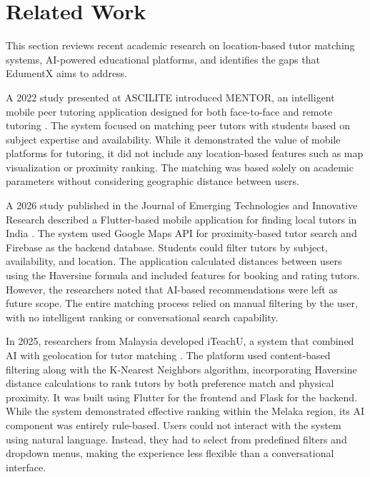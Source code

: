 \documentclass[12pt]{report}
\begin{document}
\section{Related Work}

This section reviews recent academic research on location-based
tutor matching systems, AI-powered educational platforms, and
identifies the gaps that EdumentX aims to address.

A 2022 study presented at ASCILITE introduced MENTOR, an
intelligent mobile peer tutoring application designed for both
face-to-face and remote tutoring \citep{Chung2022MENTOR}. The
system focused on matching peer tutors with students based on
subject expertise and availability. While it demonstrated the
value of mobile platforms for tutoring, it did not include any
location-based features such as map visualization or proximity
ranking. The matching was based solely on academic parameters
without considering geographic distance between users.

A 2026 study published in the Journal of Emerging Technologies
and Innovative Research described a Flutter-based mobile
application for finding local tutors in India
\citep{Sharma2026LocalTutor}. The system used Google Maps API
for proximity-based tutor search and Firebase as the backend
database. Students could filter tutors by subject, availability,
and location. The application calculated distances between
users using the Haversine formula and included features for
booking and rating tutors. However, the researchers noted that
AI-based recommendations were left as future scope. The entire
matching process relied on manual filtering by the user, with
no intelligent ranking or conversational search capability.

In 2025, researchers from Malaysia developed iTeachU, a system
that combined AI with geolocation for tutor matching
\citep{Shari2025iTeachU}. The platform used content-based
filtering along with the K-Nearest Neighbors algorithm,
incorporating Haversine distance calculations to rank tutors
by both preference match and physical proximity. It was built
using Flutter for the frontend and Flask for the backend. While
the system demonstrated effective ranking within the Melaka
region, its AI component was entirely rule-based. Users could
not interact with the system using natural language. Instead,
they had to select from predefined filters and dropdown menus,
making the experience less flexible than a conversational
interface.
\end{document}
